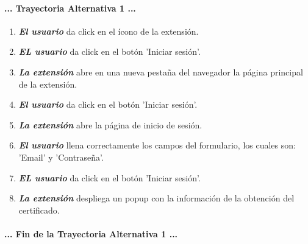 \documentclass[12pt, a4paper, titlepage]{report}
\begin{document}
				\paragraph{... Trayectoria Alternativa 1 ...}
				\begin{enumerate}
				
					\item \textbf{\textit{El usuario}} da click en el ícono de la extensión.
					
					\item \textbf{\textit{EL usuario}} da click en el botón 'Iniciar sesión'.
					
					\item \textbf{\textit{La extensión}} abre en una nueva pestaña del navegador la página principal de la extensión.
					
					\item \textbf{\textit{El usuario}} da click en el botón 'Iniciar sesión'.
					
					\item \textbf{\textit{La extensión}} abre la página de inicio de sesión.
					
					\item \textbf{\textit{El usuario}} llena correctamente los campos del formulario, los cuales son: 'Email' y 'Contraseña'.
					
					\item \textbf{\textit{EL usuario}} da click en el botón 'Iniciar sesión'.
					
					\item \textbf{\textit{La extensión}} despliega un popup con la información de la obtención del certificado.
					
				\end{enumerate}
				\paragraph{... Fin de la Trayectoria Alternativa 1 ...}
			    
			    
\end{document}
